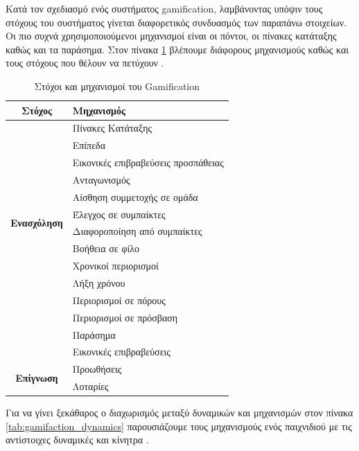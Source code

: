 		Κατά τον σχεδιασμό ενός συστήματος gamification, λαμβάνοντας υπόψιν τους στόχους του συστήματος γίνεται διαφορετικός συνδυασμός των παραπάνω στοιχείων. Οι πιο συχνά χρησιμοποιούμενοι μηχανισμοί είναι οι πόντοι, οι πίνακες κατάταξης καθώς και τα παράσημα. Στον πίνακα \ref{tab:gamifaction_mechanisms} βλέπουμε διάφορους μηχανισμούς καθώς και τους στόχους που θέλουν να πετύχουν \cite{raey}\cite{Lucassen2014194}.
	
	\begin{table}[H]
		\begin{center}
		    \begin{tabular}{|c|l|}
		    \hline
		    \rowcolor{grayy}
		    \textbf{Στόχος} & \textbf{Μηχανισμός}
		    \\ \hline    
		    \multirow{12}{*}{\textbf{Ενασχόληση}} & Πίνακες Κατάταξης \\ & Επίπεδα \\ & Εικονικές επιβραβεύσεις προσπάθειας \\ & Ανταγωνισμός \\ & Αίσθηση συμμετοχής σε ομάδα \\ &  Έλεγχος σε συμπαίκτες \\ &  Διαφοροποίηση από συμπαίκτες \\ & Βοήθεια σε φίλο \\ & Χρονικοί περιορισμοί \\ & Λήξη χρόνου \\ & Περιορισμοί σε πόρους \\ \hline
		    \multirow{3}{*}{\textbf{Αφοσίωση}}  & Περιορισμοί σε πρόσβαση \\ & Παράσημα \\ & Εικονικές επιβραβεύσεις \\ \hline
		    \multirow{3}{*}{\textbf{Επίγνωση}}  & Προωθήσεις \\ & Λοταρίες  \\ \hline
		    \end{tabular}
		    \caption{Στόχοι και μηχανισμοί του Gamification}
			\label{tab:gamifaction_mechanisms}
		\end{center}
	\end{table}

		Για να γίνει ξεκάθαρος ο διαχωρισμός μεταξύ δυναμικών και μηχανισμών στον πίνακα \ref{tab:gamifaction_dynamics} παρουσιάζουμε τους μηχανισμούς ενός παιχνιδιού με τις αντίστοιχες δυναμικές και κίνητρα \cite{BlohmIvo2013}.
	
